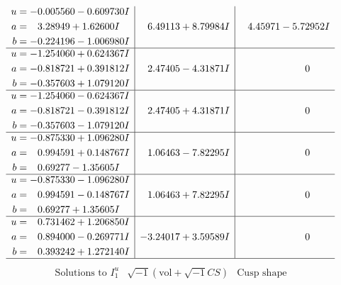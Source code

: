 \documentclass[1p]{elsarticle_modified}
\theoremstyle{definition}
\newcommand{\I}{\sqrt{-1}}
\begin{document}
$$\begin{array}{c|c|c}
\begin{aligned}
u &= -0.005560 - 0.609730 I \\
a &= \phantom{-}3.28949 + 1.62600 I \\
b &= -0.224196 - 1.006980 I\end{aligned}
 & \phantom{-}6.49113 + 8.79984 I & \phantom{-}4.45971 - 5.72952 I \\ \hline\begin{aligned}
u &= -1.254060 + 0.624367 I \\
a &= -0.818721 + 0.391812 I \\
b &= -0.357603 + 1.079120 I\end{aligned}
 & \phantom{-}2.47405 - 4.31871 I & \phantom{-0.000000 } 0 \\ \hline\begin{aligned}
u &= -1.254060 - 0.624367 I \\
a &= -0.818721 - 0.391812 I \\
b &= -0.357603 - 1.079120 I\end{aligned}
 & \phantom{-}2.47405 + 4.31871 I & \phantom{-0.000000 } 0 \\ \hline\begin{aligned}
u &= -0.875330 + 1.096280 I \\
a &= \phantom{-}0.994591 + 0.148767 I \\
b &= \phantom{-}0.69277 - 1.35605 I\end{aligned}
 & \phantom{-}1.06463 - 7.82295 I & \phantom{-0.000000 } 0 \\ \hline\begin{aligned}
u &= -0.875330 - 1.096280 I \\
a &= \phantom{-}0.994591 - 0.148767 I \\
b &= \phantom{-}0.69277 + 1.35605 I\end{aligned}
 & \phantom{-}1.06463 + 7.82295 I & \phantom{-0.000000 } 0 \\ \hline\begin{aligned}
u &= \phantom{-}0.731462 + 1.206850 I \\
a &= \phantom{-}0.894000 - 0.269771 I \\
b &= \phantom{-}0.393242 + 1.272140 I\end{aligned}
 & -3.24017 + 3.59589 I & \phantom{-0.000000 } 0\\
 \hline 
 \end{array}$$\newpage$$\begin{array}{c|c|c}  
\text{Solutions to }I^u_{1}& \I (\text{vol} + \sqrt{-1}CS) & \text{Cusp shape}\\
 \hline 
\begin{aligned}

\end{aligned}
\end{array}$$
\end{document}
